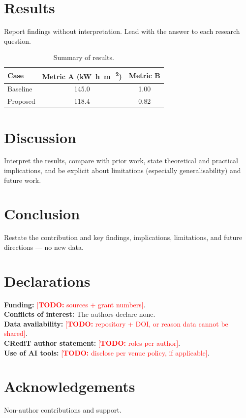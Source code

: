 \documentclass[11pt,a4paper]{article}
\newcommand{\todo}[1]{\textcolor{red}{[\textbf{TODO:} #1]}}
\begin{document}
\section{Results}\label{sec:results}
Report findings without interpretation. Lead with the answer to each research question.

\begin{table}[t]
  \centering
  \caption{Summary of results.}
  \label{tab:results}
  \begin{tabular}{l S[table-format=3.1] S[table-format=2.2]}
    \toprule
    Case & {Metric A (\unit{\kilo\watt\hour\per\meter\squared})} & {Metric B} \\
    \midrule
    Baseline & 145.0 & 1.00 \\
    Proposed & 118.4 & 0.82 \\
    \bottomrule
  \end{tabular}
\end{table}

\section{Discussion}\label{sec:discussion}
Interpret the results, compare with prior work, state theoretical and practical implications, and be
explicit about limitations (especially generalisability) and future work.

\section{Conclusion}\label{sec:conclusion}
Restate the contribution and key findings, implications, limitations, and future directions — no new data.

\section*{Declarations}
\textbf{Funding:} \todo{sources + grant numbers}.\\
\textbf{Conflicts of interest:} The authors declare none.\\
\textbf{Data availability:} \todo{repository + DOI, or reason data cannot be shared}.\\
\textbf{CRediT author statement:} \todo{roles per author}.\\
\textbf{Use of AI tools:} \todo{disclose per venue policy, if applicable}.

\section*{Acknowledgements}
Non-author contributions and support.

\end{document}
